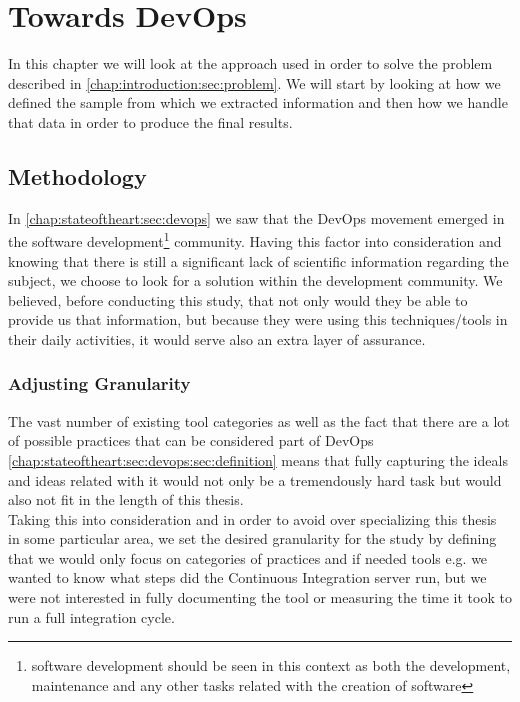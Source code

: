 \chapter{Towards DevOps} \label{chap:towardsdevops}
    In this chapter we will look at the approach used in order to solve the problem described in \ref{chap:introduction:sec:problem}. We will start by looking at how we defined the sample from which we extracted information and then how we handle that data in order to produce the final results.

    \section{Methodology} \label{chap:towardsdevops:sec:methodology}
      In \ref{chap:stateoftheart:sec:devops} we saw that the DevOps movement emerged in the software development\footnote{software development should be seen in this context as both the development, maintenance and any other tasks related with the creation of software} community. Having this factor into consideration and knowing that there is still a significant lack of scientific information regarding the subject, we choose to look for a solution within the development community. We believed, before conducting this study, that not only would they be able to provide us that information, but because they were using this techniques/tools in their daily activities, it would serve also an extra layer of assurance.

      \subsection{Adjusting Granularity}
        The vast number of existing tool categories \label{chap:stateoftheart:sec:devops:sec:tools} as well as the fact that there are a lot of possible practices that can be considered part of DevOps \ref{chap:stateoftheart:sec:devops:sec:definition} means that fully capturing the ideals and ideas related with it would not only be a tremendously hard task but would also not fit in the length of this thesis. \\
        Taking this into consideration and in order to avoid over specializing this thesis in some particular area, we set the desired granularity for the study by defining that we would only focus on categories of practices and if needed tools e.g. we wanted to know what steps did the Continuous Integration server run, but we were not interested in fully documenting the tool or measuring the time it took to run a full integration cycle. \\



